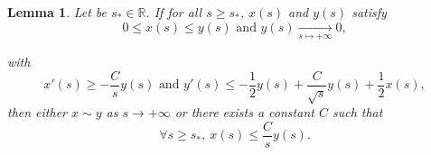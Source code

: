\documentclass[11pt,a4paper]{article}
\newcommand{\1}{\mathbbm{1}}
\numberwithin{equation}{section}
\newcommand{\numberset}{\mathbb}
\newcommand{\R}{\numberset{R}}
\newtheorem{lemma}{Lemma}[section]
\theoremstyle{remark}
\begin{document}
\begin{lemma}\label{lemma:x,y}
Let be $s_*\in \R$. If for all $s\geq s_*$, $x(s)$ and $y(s)$ satisfy
\begin{equation}\label{ineq x,y}
0\leq x(s)\leq y(s) \text{ and } y(s)\underset{s\mapsto +\infty}{\longrightarrow} 0,
\end{equation}

with 
\begin{equation}\label{ineq x',y'}
x'(s)\geq -\frac{C}{s}y(s)\text{ and } y'(s)\leq -\frac{1}{2}y(s)+\frac{C}{\sqrt{s}}y(s)+\frac{1}{2}x(s),
\end{equation}
then either $x\sim y$ as $s\rightarrow +\infty$ or there exists a constant $C$ such that
$$\forall s\geq s_*,\ x(s)\leq \frac{C}{s}y(s).$$
\end{lemma}
\end{document}
